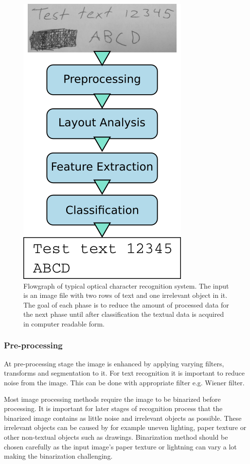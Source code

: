 \documentclass{article}
\begin{document}
    \begin{figure}
      \centering
      \includegraphics[natwidth=324,natheight=566,scale=0.4]{flowgraph.png}
      \caption{Flowgraph of typical optical character recognition system. The input is an image file with two rows of text and one irrelevant object in it. The goal of each phase is to reduce the amount of processed data for the next phase until after classification the textual data is acquired in computer readable form. \label{fig:flow} }
    \end{figure}

      \subsubsection{Pre-processing}
        At pre-processing stage the image is enhanced by applying varying filters, transforms and segmentation to it. For text recognition it is important to reduce noise from the image. This can be done with appropriate filter e.g. Wiener filter.

        Most image processing methods require the image to be binarized before processing. It is important for later stages of recognition process that the binarized image contains as little noise and irrelevant objects as possible.  These irrelevant objects can be caused by for example uneven lighting, paper texture or other non-textual objects such as drawings. Binarization method should be chosen carefully as the input image's paper texture or lightning can vary a lot making the binarization challenging.
\end{document}
